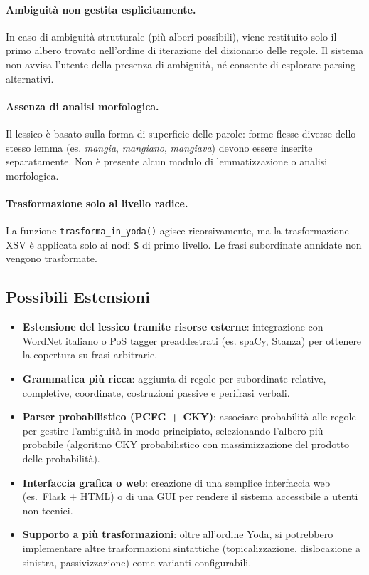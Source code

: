 \documentclass[12pt, a4paper]{article}
\begin{document}
\paragraph{Ambiguità non gestita esplicitamente.}
In caso di ambiguità strutturale (più alberi possibili), viene restituito solo
il primo albero trovato nell'ordine di iterazione del dizionario delle regole.
Il sistema non avvisa l'utente della presenza di ambiguità, né consente di
esplorare parsing alternativi.

\paragraph{Assenza di analisi morfologica.}
Il lessico è basato sulla forma di superficie delle parole: forme flesse diverse
dello stesso lemma (es. \textit{mangia}, \textit{mangiano}, \textit{mangiava})
devono essere inserite separatamente. Non è presente alcun modulo di
lemmatizzazione o analisi morfologica.

\paragraph{Trasformazione solo al livello radice.}
La funzione \texttt{trasforma\_in\_yoda()} agisce ricorsivamente, ma la
trasformazione XSV è applicata solo ai nodi \texttt{S} di primo livello.
Le frasi subordinate annidate non vengono trasformate.

\subsection{Possibili Estensioni}

\begin{itemize}
    \item \textbf{Estensione del lessico tramite risorse esterne}: integrazione con
          WordNet italiano o PoS tagger preaddestrati (es. spaCy, Stanza) per
          ottenere la copertura su frasi arbitrarie.

    \item \textbf{Grammatica più ricca}: aggiunta di regole per subordinate
          relative, completive, coordinate, costruzioni passive e perifrasi
          verbali.

    \item \textbf{Parser probabilistico (PCFG + CKY)}: associare probabilità alle
          regole per gestire l'ambiguità in modo principiato, selezionando l'albero
          più probabile (algoritmo CKY probabilistico con massimizzazione del
          prodotto delle probabilità).

    \item \textbf{Interfaccia grafica o web}: creazione di una semplice interfaccia
          web (es.\ Flask + HTML) o di una GUI per rendere il sistema accessibile
          a utenti non tecnici.

    \item \textbf{Supporto a più trasformazioni}: oltre all'ordine Yoda, si
          potrebbero implementare altre trasformazioni sintattiche (topicalizzazione,
          dislocazione a sinistra, passivizzazione) come varianti configurabili.
\end{itemize}
\end{document}
